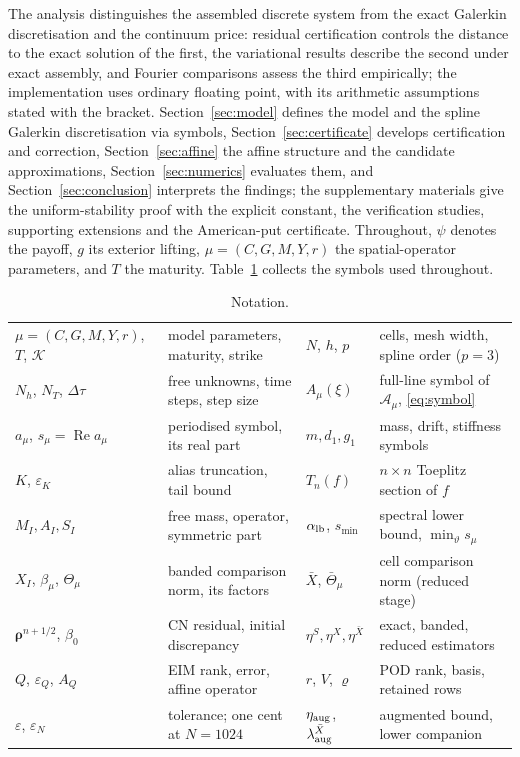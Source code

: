 \documentclass[hidelinks]{siamart251216}
\newcommand{\dt}{\Delta\tau}
\newcommand{\rr}{\bm\rho}
\newcommand{\Aop}{\mathcal A_\mu}
\DeclareMathOperator{\Real}{Re}
\newcommand{\Tn}[2]{T_{#1}(#2)}          %
\newcommand{\sym}[1]{#1}                 %
\newcommand{\smin}{s_{\min}}
\newcommand{\Thmu}{\Theta_\mu}
\begin{document}
The analysis distinguishes the assembled discrete system from the exact Galerkin discretisation
and the continuum price: residual certification controls the distance to the exact solution of the
first, the variational results describe the second under exact assembly, and Fourier comparisons
assess the third empirically; the implementation uses ordinary floating point, with its arithmetic
assumptions stated with the bracket.  Section~\ref{sec:model} defines the model and the spline
Galerkin discretisation via symbols, Section~\ref{sec:certificate} develops certification and
correction, Section~\ref{sec:affine} the affine structure and the candidate approximations,
Section~\ref{sec:numerics} evaluates them, and Section~\ref{sec:conclusion} interprets the
findings; the supplementary materials give the uniform-stability proof with the explicit constant,
the verification studies, supporting extensions and the American-put certificate.  Throughout,
$\psi$ denotes the payoff, $g$ its exterior lifting, $\mu=(C,G,M,Y,r)$ the spatial-operator
parameters, and $T$ the maturity.
Table~\ref{tab:notation} collects the symbols used throughout.
\begin{table}[ht]
\centering\footnotesize
\caption{Notation.}
\label{tab:notation}
\begin{tabular}{@{}l@{\ \ }>{\raggedright\arraybackslash}p{3.3cm}@{\ \ }l@{\ \ }>{\raggedright\arraybackslash}p{3.3cm}@{}}
\toprule
$\mu=(C,G,M,Y,r)$, $T$, $\mathcal K$ & model parameters, maturity, strike &
$N$, $h$, $p$ & cells, mesh width, spline order ($p=3$)\\
$N_h$, $N_T$, $\dt$ & free unknowns, time steps, step size &
$A_\mu(\xi)$ & full-line symbol of $\Aop$, \eqref{eq:symbol}\\
$\sym{a}_\mu$, $\sym{s}_\mu=\Real\sym{a}_\mu$ & periodised symbol, its real part &
$\sym{m},\sym{d}_1,\sym{g}_1$ & mass, drift, stiffness symbols\\
$K$, $\varepsilon_K$ & alias truncation, tail bound &
$\Tn{n}{f}$ & $n\times n$ Toeplitz section of $f$\\
$M_I,A_I,S_I$ & free mass, operator, symmetric part &
$\alpha_{\rm lb}$, $\smin$ & spectral lower bound, $\min_\vartheta\sym{s}_\mu$\\
$X_I$, $\beta_\mu$, $\Thmu$ & banded comparison norm, its factors &
$\bar X$, $\bar\Theta_\mu$ & cell comparison norm (reduced stage)\\
$\rr^{n+1/2}$, $\beta_0$ & CN residual, initial discrepancy &
$\eta^S,\eta^X,\eta^{\bar X}$ & exact, banded, reduced estimators\\
$Q$, $\varepsilon_Q$, $A_Q$ & EIM rank, error, affine operator &
$r$, $V$, $\varrho$ & POD rank, basis, retained rows\\
$\varepsilon$, $\varepsilon_N$ & tolerance; one cent at $N=1024$ &
$\eta_{\rm aug}$, $\lambda^{\bar X}_{\rm aug}$ & augmented bound, lower companion\\
\bottomrule
\end{tabular}
\end{table}
\end{document}
